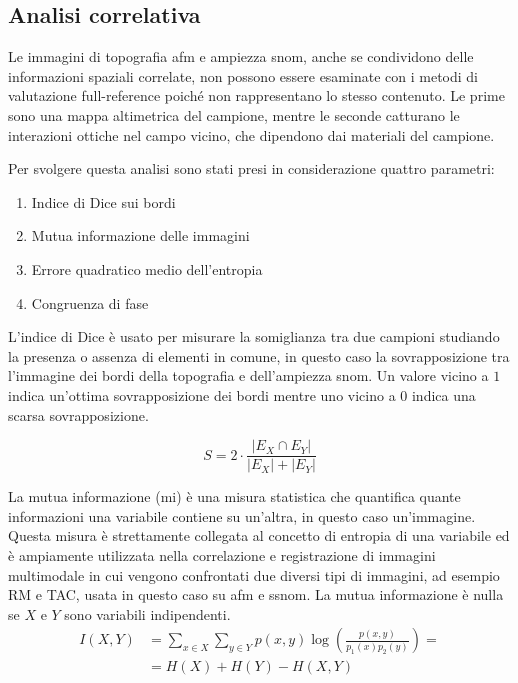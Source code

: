 \documentclass[../main.tex]{subfiles}
\begin{document}
\subsection{Analisi correlativa}

Le immagini di topografia \acrshort{afm} e ampiezza \acrshort{snom}, anche se condividono delle informazioni spaziali correlate, non possono essere esaminate con i metodi di valutazione full-reference poiché non rappresentano lo stesso contenuto. Le prime sono una mappa altimetrica del campione, mentre le seconde catturano le interazioni ottiche nel campo vicino, che dipendono dai materiali del campione.

Per svolgere questa analisi sono stati presi in considerazione quattro parametri:

\begin{enumerate}
	\itemsep0em
	\item Indice di Dice sui bordi
	\item Mutua informazione delle immagini
	\item Errore quadratico medio dell'entropia
	\item Congruenza di fase
\end{enumerate}

L'indice di Dice è usato per misurare la somiglianza tra due campioni studiando la presenza o assenza di elementi in comune, in questo caso la sovrapposizione tra l'immagine dei bordi della topografia e dell'ampiezza \acrshort{snom}. Un valore vicino a $1$ indica un'ottima sovrapposizione dei bordi mentre uno vicino a $0$ indica una scarsa sovrapposizione.\cite{carass_2020}

\begin{equation}
	S = 2\cdot \frac{\left|E_{X} \cap  E_{Y}\right|}{\left|E_{X}\right| + \left|E_{Y}\right|}
\end{equation}

La mutua informazione (\acrshort{mi}) è una misura statistica che quantifica quante informazioni una variabile contiene su un'altra, in questo caso un'immagine.\cite{shannon_1948} Questa misura è strettamente collegata al concetto di entropia di una variabile ed è ampiamente utilizzata nella correlazione e registrazione di immagini multimodale in cui vengono confrontati due diversi tipi di immagini,\cite{viola_1997} ad esempio RM e TAC,\cite{mclaughlin_2004, veninga_2004} usata in questo caso su \acrshort{afm} e \acrshort{ssnom}. La mutua informazione è nulla se $X$ e $Y$ sono variabili indipendenti.
\begin{equation}
	\begin{aligned}
		I(X,Y)  &= \sum_{x\in X}\sum_{y\in Y} p(x,y) \log\left(\frac{p(x,y)}{p_1(x)p_2(y)}\right) =\\
		&= H(X) + H(Y) - H(X,Y)
	\end{aligned}
\end{equation}
\end{document}
